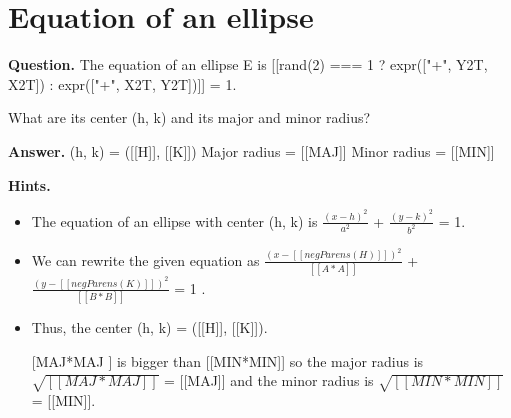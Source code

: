\documentclass{article}
\begin{document}
\section*{Equation of an ellipse}
\textbf{Question.} The equation of an ellipse E is [[rand(2) === 1 ? expr(["+", Y2T, X2T]) : expr(["+", X2T, Y2T])]] = 1.

                What are its center (h, k) and its  major and minor radius?

\textbf{Answer.} (h, k) = ([[H]], [[K]])
                Major radius = [[MAJ]]
                Minor radius = [[MIN]]

\textbf{Hints.}
\begin{itemize}
  \item The equation of an ellipse with center (h, k) is  $\frac{(x - h)^2}{a^2}$ + $\frac{(y - k)^2}{b^2}$ = 1.
  \item We can rewrite the given equation as $\frac{(x - [[negParens(H)]])^2}{[[A*A]]}$ + $\frac{(y - [[negParens(K)]])^2}{[[B*B]]}$ = 1 .
  \item Thus, the center (h, k) = ([[H]], [[K]]).
  \item [[MAJ*MAJ]] is bigger than [[MIN*MIN]] so the major radius is $\sqrt{[[MAJ*MAJ]]}$ = [[MAJ]] and the minor radius is $\sqrt{[[MIN*MIN]]}$ = [[MIN]].
\end{itemize}
\end{document}
